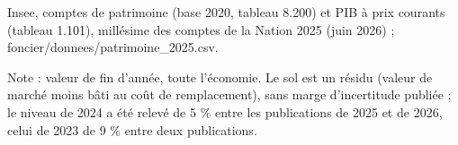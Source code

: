 Insee, comptes de patrimoine (base 2020, tableau 8.200) et PIB à prix courants (tableau 1.101), millésime des comptes de la Nation 2025 (juin 2026) ; foncier/donnees/patrimoine\_2025.csv.\par Note : valeur de fin d'année, toute l'économie. Le sol est un résidu (valeur de marché moins bâti au coût de remplacement), sans marge d'incertitude publiée ; le niveau de 2024 a été relevé de 5 \% entre les publications de 2025 et de 2026, celui de 2023 de 9 \% entre deux publications.

